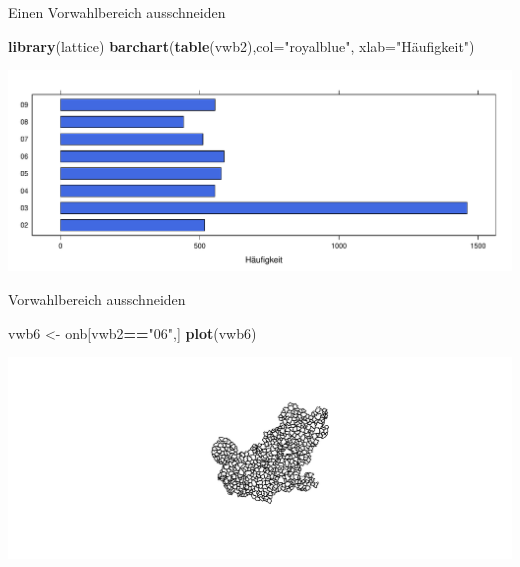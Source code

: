 \documentclass[ignorenonframetext,]{beamer}
\newenvironment{Shaded}{\begin{snugshade}}{\end{snugshade}}
\newcommand{\DataTypeTok}[1]{\textcolor[rgb]{0.13,0.29,0.53}{#1}}
\newcommand{\DecValTok}[1]{\textcolor[rgb]{0.00,0.00,0.81}{#1}}
\newcommand{\KeywordTok}[1]{\textcolor[rgb]{0.13,0.29,0.53}{\textbf{#1}}}
\newcommand{\NormalTok}[1]{#1}
\newcommand{\OperatorTok}[1]{\textcolor[rgb]{0.81,0.36,0.00}{\textbf{#1}}}
\newcommand{\StringTok}[1]{\textcolor[rgb]{0.31,0.60,0.02}{#1}}
\begin{document}
\begin{frame}[fragile]{Einen Vorwahlbereich ausschneiden}
\protect\hypertarget{einen-vorwahlbereich-ausschneiden}{}

\begin{Shaded}
\end{Shaded}

\begin{Shaded}
\begin{Highlighting}[]
\KeywordTok{library}\NormalTok{(lattice)}
\KeywordTok{barchart}\NormalTok{(}\KeywordTok{table}\NormalTok{(vwb2),}\DataTypeTok{col=}\StringTok{"royalblue"}\NormalTok{,}
         \DataTypeTok{xlab=}\StringTok{"Häufigkeit"}\NormalTok{)}
\end{Highlighting}
\end{Shaded}

\includegraphics{shapefiles_files/figure-beamer/unnamed-chunk-11-1.pdf}

\end{frame}

\begin{frame}[fragile]{Vorwahlbereich ausschneiden}
\protect\hypertarget{vorwahlbereich-ausschneiden}{}

\begin{Shaded}
\begin{Highlighting}[]
\NormalTok{vwb6 <-}\StringTok{ }\NormalTok{onb[vwb2}\OperatorTok{==}\StringTok{"06"}\NormalTok{,]}
\KeywordTok{plot}\NormalTok{(vwb6)}
\end{Highlighting}
\end{Shaded}

\includegraphics{shapefiles_files/figure-beamer/unnamed-chunk-12-1.pdf}

\end{frame}
\end{document}
